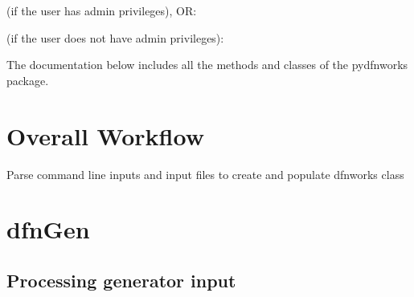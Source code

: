 \documentclass[letterpaper,10pt,english]{sphinxmanual}
\begin{document}
 (if the user has admin privileges), OR:

 (if the user does not have admin privileges):

The documentation below includes all the methods and classes of the pydfnworks package.


\section{Overall Workflow}
\label{\detokenize{pydfnworks:overall-workflow}}

\begin{fulllineitems}
\label{\detokenize{pydfnworks:pydfnworks.create_dfn}}
Parse command line inputs and input files to create and populate dfnworks class

\end{fulllineitems}



\section{dfnGen}
\label{\detokenize{pydfnworks:dfngen}}

\subsection{Processing generator input}
\label{\detokenize{pydfnworks:processing-generator-input}}\label{\detokenize{pydfnworks:module-pydfnworks.gen_input}}
\end{document}
